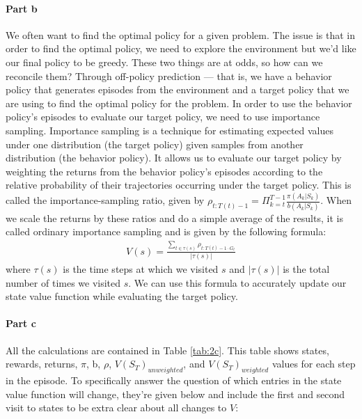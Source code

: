 \documentclass[12pt]{article}
\begin{document}
\paragraph{Part b} We often want to find the optimal policy for a given problem. The issue is that in order to find the optimal policy, we need to explore the environment but we'd like our final policy to be greedy. These two things are at odds, so how can we reconcile them? Through off-policy prediction --- that is, we have a behavior policy that generates episodes from the environment and a target policy that we are using to find the optimal policy for the problem. In order to use the behavior policy's episodes to evaluate our target policy, we need to use importance sampling. Importance sampling is a technique for estimating expected values under one distribution (the target policy) given samples from another distribution (the behavior policy). It allows us to evaluate our target policy by weighting the returns from the behavior policy's episodes according to the relative probability of their trajectories occurring under the target policy. This is called the importance-sampling ratio, given by $\rho_{t:T(t)-1} = \Pi_{k=t}^{T-1}\frac{\pi(A_k|S_k)}{b(A_k|S_k)}$. When we scale the returns by these ratios and do a simple average of the results, it is called ordinary importance sampling and is given by the following formula:
\begin{gather*}
  V(s) = \frac{\sum_{t \in \tau(s)}\rho_{t:T(t)-1 \cdot G_t}}{|\tau(s)|}
\end{gather*}
where $\tau(s)$ is the time steps at which we visited $s$ and $|\tau(s)|$ is the total number of times we visited $s$. We can use this formula to accurately update our state value function while evaluating the target policy.


\paragraph{Part c} All the calculations are contained in Table \ref{tab:2c}. This table shows states, rewards, returns, $\pi$, b, $\rho$, $V(S_T)_{unweighted}$, and $V(S_T)_{weighted}$ values for each step in the episode. To specifically answer the question of which entries in the state value function will change, they're given below and include the first and second visit to states to be extra clear about all changes to $V$:
\end{document}
